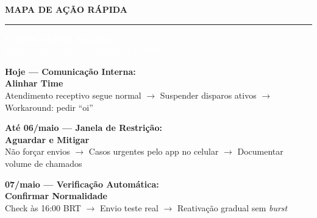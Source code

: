 \documentclass[12pt, a4paper]{article}
\begin{document}
\begin{center}
    {\Huge \textcolor{primaryColor}{\textbf{MAPA DE AÇÃO RÁPIDA}}} \\
    \vspace{1cm}
    \rule{12cm}{1.5pt}
    \vspace{1cm}

    \colorbox{accentColor}{%
        \parbox{0.92\textwidth}{%
            \centering
            \vspace{0.8cm}
            \textcolor{white}{\Huge \textbf{O QUE FAZER AGORA}} \\
            \vspace{0.3cm}
            \textcolor{white}{\Large Janela ativa até 06/maio/2026 17:13 BRT} \\
            \vspace{0.8cm}
        }%
    }

    \vspace{1cm}

    \begin{flushleft}
    \large
    \textbf{Hoje --- Comunicação Interna:} \\
    \vspace{0.3cm}
    \hspace{1cm} \textcolor{accentColor}{\Large \textbf{Alinhar Time}} \\
    \hspace{1cm} \textcolor{secondaryText}{Atendimento receptivo segue normal $\rightarrow$ Suspender disparos ativos $\rightarrow$ Workaround: pedir ``oi''} \\

    \vspace{1cm}

    \textbf{Até 06/maio --- Janela de Restrição:} \\
    \vspace{0.3cm}
    \hspace{1cm} \textcolor{accentColor}{\Large \textbf{Aguardar e Mitigar}} \\
    \hspace{1cm} \textcolor{secondaryText}{Não forçar envios $\rightarrow$ Casos urgentes pelo app no celular $\rightarrow$ Documentar volume de chamados} \\

    \vspace{1cm}

    \textbf{07/maio --- Verificação Automática:} \\
    \vspace{0.3cm}
    \hspace{1cm} \textcolor{accentColor}{\Large \textbf{Confirmar Normalidade}} \\
    \hspace{1cm} \textcolor{secondaryText}{Check às 16:00 BRT $\rightarrow$ Envio teste real $\rightarrow$ Reativação gradual sem \textit{burst}} \\


\end{flushleft}
\end{center}
\end{document}
